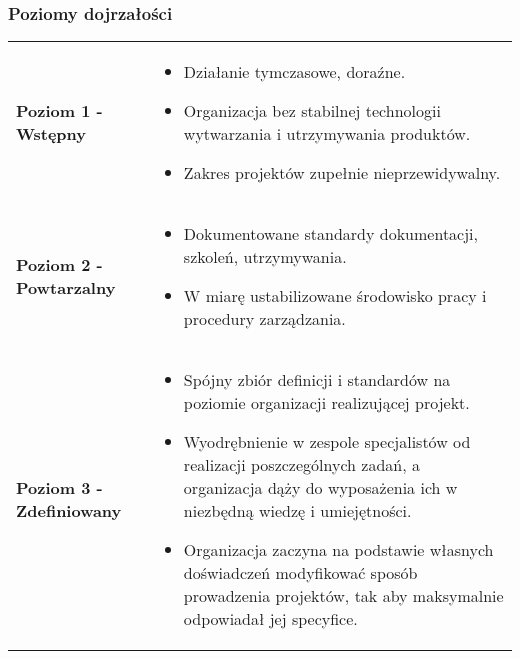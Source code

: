 \documentclass[../main.tex]{subfiles}
\begin{document}
    \subsubsection{Poziomy dojrzałości}
    \begin{table}[H]
        \begin{center}
            \begin{tabular}{ p{8cm} p{8cm} }
                \textbf{Poziom 1 - Wstępny}
                &
                \begin{itemize}
                    \item Działanie tymczasowe, doraźne.
                    \item Organizacja bez stabilnej technologii wytwarzania i utrzymywania produktów.
                    \item Zakres projektów zupełnie nieprzewidywalny.
                \end{itemize}
                \\

                \textbf{Poziom 2 - Powtarzalny}
                &
                \begin{itemize}
                    \item Dokumentowane standardy dokumentacji, szkoleń, utrzymywania.
                    \item W miarę ustabilizowane środowisko pracy i procedury zarządzania.
                \end{itemize}
                \\

                \textbf{Poziom 3 - Zdefiniowany}
                &
                \begin{itemize}
                    \item Spójny zbiór definicji i standardów na poziomie
                    organizacji realizującej projekt.
                    \item Wyodrębnienie w zespole specjalistów od realizacji
                    poszczególnych zadań, a organizacja dąży do wyposażenia ich
                    w niezbędną wiedzę i umiejętności.
                    \item Organizacja zaczyna na podstawie własnych doświadczeń
                    modyfikować sposób prowadzenia projektów, tak aby
                    maksymalnie odpowiadał jej specyfice.
                \end{itemize}
                \\


\end{tabular}
\end{center}
\end{table}
\end{document}
